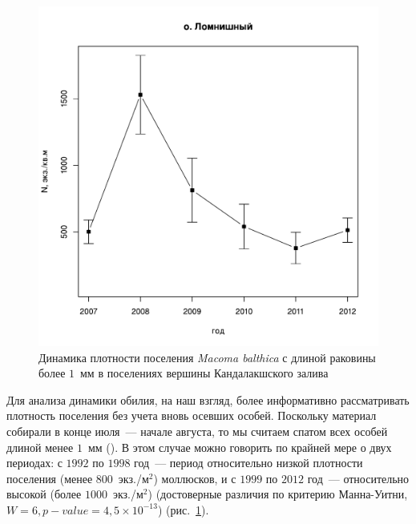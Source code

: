 \begin{figure}[p]
\begin{minipage}[b]{.49\linewidth}
\begin{center}
	\end{center}
	\end{minipage}
%
	\hfil %
%
	\begin{minipage}[b]{.49\linewidth}
	\begin{center}
		\includegraphics[width=\linewidth]{../White_Sea/Lomnishniy/N2_dynamic1.pdf}
	\end{center}
	\end{minipage}



	\caption{Динамика плотности поселения {\it Macoma balthica} с длиной раковины более $1$~мм в поселениях вершины Кандалакшского залива}
	\label{ris:dynamic_Kandalaksha_all2}
	\end{figure}



Для анализа динамики обилия, на наш взгляд, более информативно рассматривать плотность поселения без учета вновь осевших особей. 
Поскольку материал собирали в конце июля~--- начале августа, то мы считаем спатом всех особей длиной менее $1$~мм (\cite{Zubakha_et_al_2000}).
В этом случае можно говорить по крайней мере о двух периодах: с $1992$ по $1998$ год~--- период относительно низкой плотности поселения (менее $800$~экз./м$^2$) моллюсков, и с $1999$ по $2012$ год~--- относительно высокой (более $1000$~экз./м$^2$) (достоверные различия по критерию Манна-Уитни, $W = 6, p-value = 4,5 \times 10^{-13}$) (рис.~\ref{ris:dynamic_Kandalaksha_all2}).

